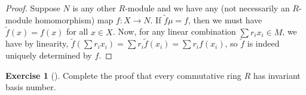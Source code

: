 \documentclass[reqno]{amsart}
\theoremstyle{definition}
\newtheorem{exercise}[theorem]{Exercise}
\theoremstyle{remark}
\begin{document}
\begin{proof}
            Suppose $N$ is any other $R$-module
            and we have any (not necessarily an
            $R$-module homomorphism) map $f \colon X \to N$.
            If $\tilde{f} \mu = f$, then we
            must have $\tilde{f} (x) = f(x)$ for
            all $x \in X$. Now, for any linear combination
            $\sum r_i x_i \in M$, we have
            by linearity, 
            $\tilde{f} \left( \sum r_i x_i \right) 
            = \sum r_i \tilde{f}(x_i)
            = \sum r_i f(x_i)$, so
            $\tilde{f}$ is indeed uniquely determined
            by $f$.

        \end{proof}


        \begin{exercise}[]
            Complete the proof that every commutative
            ring $R$ has invariant basis number.
        \end{exercise}
\end{document}
